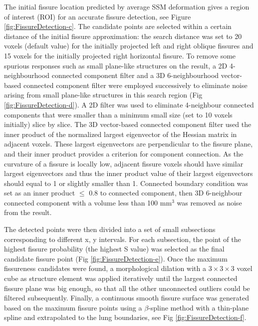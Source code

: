{The initial fissure location predicted by average SSM deformation gives a region of interest (ROI) for an accurate fissure detection, see Figure \ref{fig:FissureDetection-c}. The candidate points are selected within a certain distance of the initial fissure approximation: the search distance was set to 20 voxels (default value) for the initially projected left and right oblique fissures and 15 voxels for the initially projected right horizontal fissure. To remove some spurious responses such as small plane-like structures on the result, a 2D 4-neighbourhood connected component filter and a 3D 6-neighbourhood vector-based connected component filter were employed successively to eliminate noise arising from small plane-like structures in this search region (Fig \ref{fig:FissureDetection-d}). A 2D filter was used to eliminate 4-neighbour connected components that were smaller than a minimum small size (set to 10 voxels initially) slice by slice. The 3D vector-based connected component filter used the inner product of the normalized largest eigenvector of the Hessian matrix in adjacent voxels. These largest eigenvectors are perpendicular to the fissure plane, and their inner product provides a criterion for component connection. As the curvature of a fissure is locally low, adjacent fissure voxels should have similar largest eigenvectors and thus the inner product value of their largest eigenvectors should equal to 1 or slightly smaller than 1. Connected boundary condition was set as an inner product $\leq$ 0.8 to connected component, then 3D 6-neighbour connected component with a volume less than 100 $\mathrm{mm^3}$ was removed as noise from the result.

The detected points were then divided into a set of small subsections corresponding to different x, y intervals. For each subsection, the point of the highest fissure probability (the highest S value) was selected as the final candidate fissure point (Fig \ref{fig:FissureDetection-e}). Once the maximum fissureness candidates were found, a morphological dilation with a $3\times3\times3$ voxel cube as structure element was applied iteratively until the largest connected fissure plane was big enough, so that all the other unconnected outliers could be filtered subsequently. Finally, a continuous smooth fissure surface was generated based on the maximum fissure points using a $\beta$-spline method with a thin-plane spline \citep{lee1997scattered} and extrapolated to the lung boundaries, see Fig \ref{fig:FissureDetection-f}.

}
